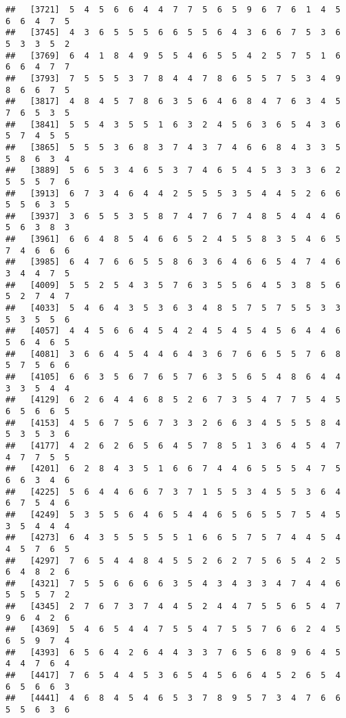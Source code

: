 \documentclass[
]{book}
\begin{document}
\begin{verbatim}
##   [3721]  5  4  5  6  6  4  4  7  7  5  6  5  9  6  7  6  1  4  5  6  6  4  7  5
##   [3745]  4  3  6  5  5  5  6  6  5  5  6  4  3  6  6  7  5  3  6  5  3  3  5  2
##   [3769]  6  4  1  8  4  9  5  5  4  6  5  5  4  2  5  7  5  1  6  6  6  4  7  7
##   [3793]  7  5  5  5  3  7  8  4  4  7  8  6  5  5  7  5  3  4  9  8  6  6  7  5
##   [3817]  4  8  4  5  7  8  6  3  5  6  4  6  8  4  7  6  3  4  5  7  6  5  3  5
##   [3841]  5  5  4  3  5  5  1  6  3  2  4  5  6  3  6  5  4  3  6  5  7  4  5  5
##   [3865]  5  5  5  3  6  8  3  7  4  3  7  4  6  6  8  4  3  3  5  5  8  6  3  4
##   [3889]  5  6  5  3  4  6  5  3  7  4  6  5  4  5  3  3  3  6  2  5  5  5  7  6
##   [3913]  6  7  3  4  6  4  4  2  5  5  5  3  5  4  4  5  2  6  6  5  5  6  3  5
##   [3937]  3  6  5  5  3  5  8  7  4  7  6  7  4  8  5  4  4  4  6  5  6  3  8  3
##   [3961]  6  6  4  8  5  4  6  6  5  2  4  5  5  8  3  5  4  6  5  7  4  6  6  6
##   [3985]  6  4  7  6  6  5  5  8  6  3  6  4  6  6  5  4  7  4  6  3  4  4  7  5
##   [4009]  5  5  2  5  4  3  5  7  6  3  5  5  6  4  5  3  8  5  6  5  2  7  4  7
##   [4033]  5  4  6  4  3  5  3  6  3  4  8  5  7  5  7  5  5  3  3  5  3  5  5  6
##   [4057]  4  4  5  6  6  4  5  4  2  4  5  4  5  4  5  6  4  4  6  5  6  4  6  5
##   [4081]  3  6  6  4  5  4  4  6  4  3  6  7  6  6  5  5  7  6  8  5  7  5  6  6
##   [4105]  6  6  3  5  6  7  6  5  7  6  3  5  6  5  4  8  6  4  4  3  3  5  4  4
##   [4129]  6  2  6  4  4  6  8  5  2  6  7  3  5  4  7  7  5  4  5  6  5  6  6  5
##   [4153]  4  5  6  7  5  6  7  3  3  2  6  6  3  4  5  5  5  8  4  5  3  5  3  6
##   [4177]  4  2  6  2  6  5  6  4  5  7  8  5  1  3  6  4  5  4  7  4  7  7  5  5
##   [4201]  6  2  8  4  3  5  1  6  6  7  4  4  6  5  5  5  4  7  5  6  6  3  4  6
##   [4225]  5  6  4  4  6  6  7  3  7  1  5  5  3  4  5  5  3  6  4  6  7  5  4  6
##   [4249]  5  3  5  5  6  4  6  5  4  4  6  5  6  5  5  7  5  4  5  3  5  4  4  4
##   [4273]  6  4  3  5  5  5  5  5  1  6  6  5  7  5  7  4  4  5  4  4  5  7  6  5
##   [4297]  7  6  5  4  4  8  4  5  5  2  6  2  7  5  6  5  4  2  5  6  4  8  2  6
##   [4321]  7  5  5  6  6  6  6  3  5  4  3  4  3  3  4  7  4  4  6  5  5  5  7  2
##   [4345]  2  7  6  7  3  7  4  4  5  2  4  4  7  5  5  6  5  4  7  9  6  4  2  6
##   [4369]  5  4  6  5  4  4  7  5  5  4  7  5  5  7  6  6  2  4  5  6  5  9  7  4
##   [4393]  6  5  6  4  2  6  4  4  3  3  7  6  5  6  8  9  6  4  5  4  4  7  6  4
##   [4417]  7  6  5  4  4  5  3  6  5  4  5  6  6  4  5  2  6  5  4  6  5  6  6  3
##   [4441]  4  6  8  4  5  4  6  5  3  7  8  9  5  7  3  4  7  6  6  5  5  6  3  6

\end{verbatim}
\end{document}
